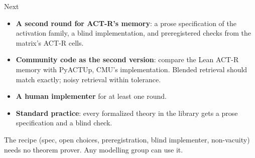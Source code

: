 \documentclass[aspectratio=169,11pt]{beamer}
\begin{document}
\begin{frame}{Next}
  \begin{itemize}
    \item \textbf{A second round for ACT-R's memory}: a prose specification of the activation family, a blind implementation, and preregistered checks from the matrix's ACT-R cells.
    \item \textbf{Community code as the second version}: compare the Lean ACT-R memory with PyACTUp, CMU's implementation. Blended retrieval should match exactly; noisy retrieval within tolerance.
    \item \textbf{A human implementer} for at least one round.
    \item \textbf{Standard practice}: every formalized theory in the library gets a prose specification and a blind check.
  \end{itemize}
  \bigskip
  \small The recipe (spec, open choices, preregistration, blind implementer, non-vacuity) needs no theorem prover. Any modelling group can use it.
\end{frame}
\end{document}
